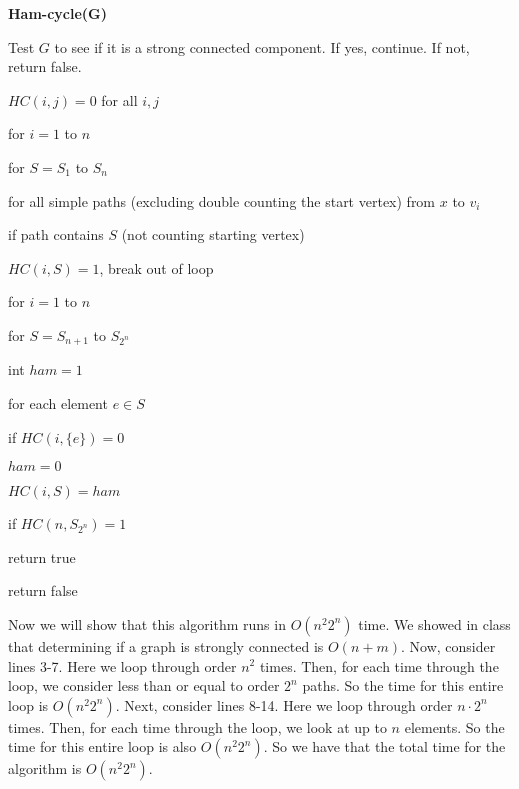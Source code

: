 \documentclass{article}
\begin{document}
\vspace{5mm}
\noindent \textbf{Ham-cycle(G)}
\begin{enumerate}
    \item Test $G$ to see if it is a strong connected component. If yes,
        continue. If not, return false.
    \item $HC(i,j) = 0$ for all $i,j$
    \item for $i=1$ to $n$
    {\setlength\itemindent{25pt} \item for $S=S_1$ to $S_n$ }
    {\setlength\itemindent{50pt} \item for all simple paths (excluding double
    counting the start vertex) from $x$ to $v_i$ }
    {\setlength\itemindent{75pt} \item if path contains $S$ (not counting
    starting vertex) }
    {\setlength\itemindent{100pt} \item $HC(i,S) = 1$, break out of loop }

    \item for $i=1$ to $n$
    {\setlength\itemindent{25pt} \item for $S=S_{n+1}$ to $S_{2^n}$ }
    {\setlength\itemindent{50pt} \item int $ham = 1$}
    {\setlength\itemindent{50pt} \item for each element $e \in S$}
    {\setlength\itemindent{75pt} \item if $HC(i,\{e\}) = 0$ }
    {\setlength\itemindent{75pt} \item $ham = 0$ }
    {\setlength\itemindent{50pt} \item $HC(i,S) = ham$ }
    \item if $HC(n,S_{2^n}) = 1$
    {\setlength\itemindent{25pt} \item return true}
    \item return false

\end{enumerate}

\vspace{5mm}
Now we will show that this algorithm runs in $O(n^2 2^n)$ time. We showed in
class that determining if a graph is strongly connected is $O(n+m)$. Now, consider
lines 3-7. Here we loop through order $n^2$ times. Then, for each time through
the loop, we consider less than or equal to order $2^n$ paths. So the time for
this entire loop is $O(n^2 2^n)$. Next, consider lines 8-14. Here we loop through order
$n \cdot 2^n$ times. Then, for each time through the loop, we look at up to $n$
elements. So the time for this entire loop is also $O(n^2 2^n)$. So we have that
the total time for the algorithm is $O(n^2 2^n)$.
\end{document}
